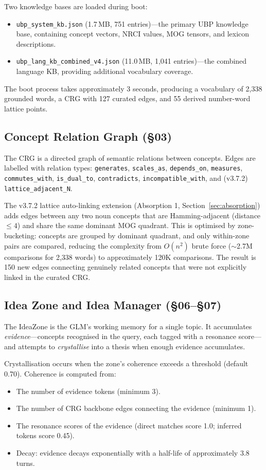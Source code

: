 \documentclass[11pt,a4paper]{article}
\begin{document}
Two knowledge bases are loaded during boot:
\begin{itemize}
    \item \texttt{ubp\_system\_kb.json} (1.7\,MB, 751 entries)---the primary UBP knowledge base, containing concept vectors, NRCI values, MOG tensors, and lexicon descriptions.
    \item \texttt{ubp\_lang\_kb\_combined\_v4.json} (11.0\,MB, 1,041 entries)---the combined language KB, providing additional vocabulary coverage.
\end{itemize}

The boot process takes approximately 3 seconds, producing a vocabulary of 2,338 grounded words, a CRG with 127 curated edges, and 55 derived number-word lattice points.

\subsection{Concept Relation Graph (\S03)}

The CRG is a directed graph of semantic relations between concepts. Edges are labelled with relation types: \texttt{generates}, \texttt{scales\_as}, \texttt{depends\_on}, \texttt{measures}, \texttt{commutes\_with}, \texttt{is\_dual\_to}, \texttt{contradicts}, \texttt{incompatible\_with}, and (v3.7.2) \texttt{lattice\_adjacent\_N}.

The v3.7.2 lattice auto-linking extension (Absorption 1, Section~\ref{sec:absorption}) adds edges between any two noun concepts that are Hamming-adjacent (distance $\leq 4$) and share the same dominant MOG quadrant. This is optimised by zone-bucketing: concepts are grouped by dominant quadrant, and only within-zone pairs are compared, reducing the complexity from $O(n^2)$ brute force ($\sim$2.7M comparisons for 2,338 words) to approximately 120K comparisons. The result is 150 new edges connecting genuinely related concepts that were not explicitly linked in the curated CRG.

\subsection{Idea Zone and Idea Manager (\S06--\S07)}

The IdeaZone is the GLM's working memory for a single topic. It accumulates \emph{evidence}---concepts recognised in the query, each tagged with a resonance score---and attempts to \emph{crystallise} into a thesis when enough evidence accumulates.

Crystallisation occurs when the zone's coherence exceeds a threshold (default 0.70). Coherence is computed from:
\begin{itemize}
    \item The number of evidence tokens (minimum 3).
    \item The number of CRG backbone edges connecting the evidence (minimum 1).
    \item The resonance scores of the evidence (direct matches score 1.0; inferred tokens score 0.45).
    \item Decay: evidence decays exponentially with a half-life of approximately 3.8 turns.
\end{itemize}
\end{document}
